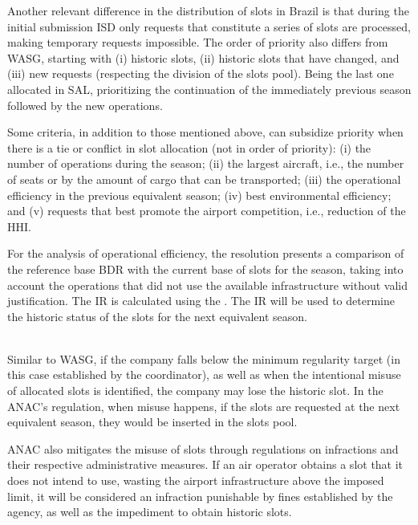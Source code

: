 %

Another relevant difference in the distribution of slots in Brazil is that during the initial submission \acrshort{ISD} only requests that constitute a series of slots are processed, making temporary requests impossible. The order of priority also differs from \acrshort{WASG}, starting with (i) historic slots, (ii) historic slots that have changed, and (iii) new requests (respecting the division of the slots pool). Being the last one allocated in \acrshort{SAL}, prioritizing the continuation of the immediately previous season followed by the new operations.

Some criteria, in addition to those mentioned above, can subsidize priority when there is a tie or conflict in slot allocation (not in order of priority): (i) the number of operations during the season; (ii) the largest aircraft, i.e., the number of seats or by the amount of cargo that can be transported; (iii) the operational efficiency in the previous equivalent season; (iv) best environmental efficiency; and (v) requests that best promote the airport competition, i.e., reduction of the \acrfull{HHI}.

For the analysis of operational efficiency, the resolution presents a comparison of the reference base \acrshort{BDR} with the current base of slots for the season, taking into account the operations that did not use the available infrastructure without valid justification. The \acrfull{IR} is calculated using the . The \acrshort{IR} will be used to determine the historic status of the slots for the next equivalent season. 

\\
 Similar to \acrshort{WASG}, if the company falls below the minimum regularity target (in this case established by the coordinator), as well as when the intentional misuse of allocated slots is identified, the company may lose the historic slot. In the \acrshort{ANAC}’s regulation, when misuse happens, if the slots are requested at the next equivalent season, they would be inserted in the slots pool.

 \acrshort{ANAC} also mitigates the misuse of slots through regulations on infractions and their respective administrative measures. If an air operator obtains a slot that it does not intend to use, wasting the airport infrastructure above the imposed limit, it will be considered an infraction punishable by fines established by the agency, as well as the impediment to obtain historic slots.

